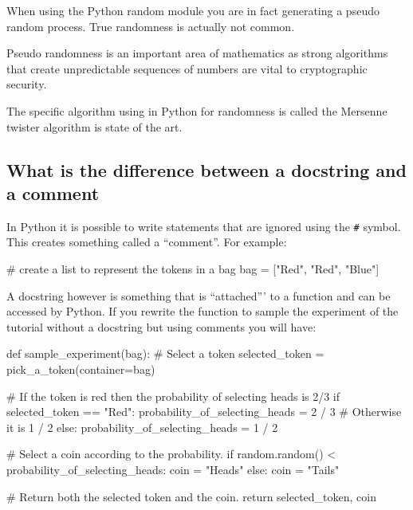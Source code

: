 When using the Python random module you are in fact generating a pseudo random
process. True randomness is actually not common.


Pseudo randomness is an important area of mathematics as strong algorithms that
create unpredictable sequences of numbers are vital to cryptographic security.


The specific algorithm using in Python for randomness is called the Mersenne
twister algorithm is state of the art.


\subsection{What is the difference between a docstring and a comment}
\label{\detokenize{tools-for-mathematics/06-probability/why/main:what-is-the-difference-between-a-docstring-and-a-comment}}\label{\detokenize{tools-for-mathematics/06-probability/why/main:difference-between-a-docstring-and-a-comment}}

In Python it is possible to write statements that are ignored using the \texttt{\#}
symbol. This creates something called a “comment”. For example:




\begin{pyin}
# create a list to represent the tokens in a bag
bag = ["Red", "Red", "Blue"]
\end{pyin}

A docstring however is something that is ``attached''' to a function and can be
accessed by Python.
If you rewrite the function to sample the experiment of the tutorial without a
docstring but using comments you will have:





\begin{pyin}
def sample_experiment(bag):
    # Select a token
    selected_token = pick_a_token(container=bag)

    # If the token is red then the probability of selecting heads is 2/3
    if selected_token == "Red":
        probability_of_selecting_heads = 2 / 3
    # Otherwise it is 1 / 2
    else:
        probability_of_selecting_heads = 1 / 2

    # Select a coin according to the probability.
    if random.random() < probability_of_selecting_heads:
        coin = "Heads"
    else:
        coin = "Tails"

    # Return both the selected token and the coin.
    return selected_token, coin
\end{pyin}






